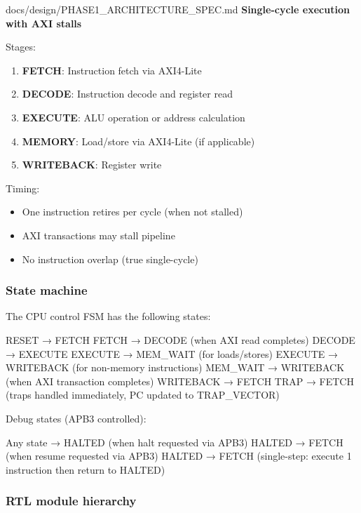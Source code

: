 \begin{relocated}{docs/design/PHASE1_ARCHITECTURE_SPEC.md}
\textbf{Single-cycle execution with AXI stalls}

Stages:

\begin{enumerate}
\def\labelenumi{\arabic{enumi}.}
\tightlist
\item
  \textbf{FETCH}: Instruction fetch via AXI4-Lite
\item
  \textbf{DECODE}: Instruction decode and register read
\item
  \textbf{EXECUTE}: ALU operation or address calculation
\item
  \textbf{MEMORY}: Load/\allowbreak{}store via AXI4-Lite (if applicable)
\item
  \textbf{WRITEBACK}: Register write
\end{enumerate}

Timing:

\begin{itemize}
\tightlist
\item
  One instruction retires per cycle (when not stalled)
\item
  AXI transactions may stall pipeline
\item
  No instruction overlap (true single-cycle)
\end{itemize}

\subsubsection{State machine}\label{ds:ch:phase1-architecture:state-machine}

The CPU control FSM has the following states:

\begin{textblock}
RESET       → FETCH
FETCH       → DECODE (when AXI read completes)
DECODE      → EXECUTE
EXECUTE     → MEM_WAIT (for loads/stores)
EXECUTE     → WRITEBACK (for non-memory instructions)
MEM_WAIT    → WRITEBACK (when AXI transaction completes)
WRITEBACK   → FETCH
TRAP        → FETCH (traps handled immediately, PC updated to TRAP_VECTOR)
\end{textblock}

Debug states (APB3 controlled):

\begin{textblock}
Any state   → HALTED (when halt requested via APB3)
HALTED      → FETCH (when resume requested via APB3)
HALTED      → FETCH (single-step: execute 1 instruction then return to HALTED)
\end{textblock}

\subsubsection{RTL module hierarchy}\label{ds:ch:phase1-architecture:rtl-module-hierarchy}


\end{relocated}
